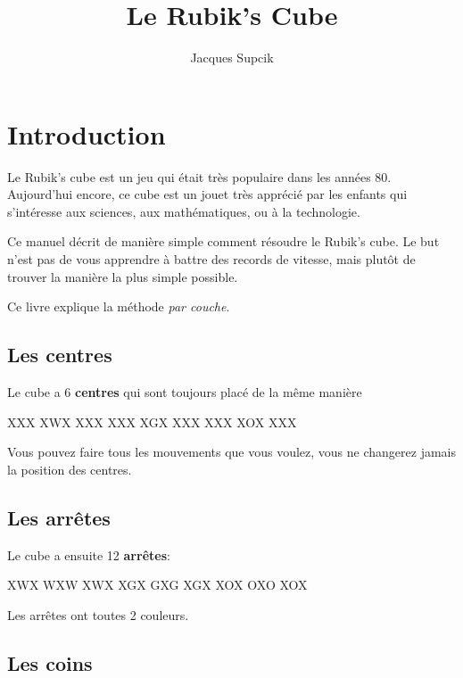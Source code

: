 \documentclass[10pt,paper=a5,pagesize]{scrbook}
\author{Jacques Supcik}
\title{Le Rubik's Cube}
\begin{document}
\maketitle
\tableofcontents

\chapter{Introduction}

Le Rubik's cube est un jeu qui était très populaire dans les années 80.
Aujourd'hui encore, ce cube est un jouet très apprécié par les enfants
qui s'intéresse aux sciences, aux mathématiques, ou à la technologie.

Ce manuel décrit de manière simple comment résoudre le Rubik's cube. Le but n'est pas de vous
apprendre à battre des records de vitesse, mais plutôt de trouver la manière la plus simple possible.

Ce livre explique la méthode \emph{par couche}.

\section{Les centres}

Le cube a 6 \textbf{centres} qui sont toujours placé de la même manière

\begin{center}
	\RubikFaceUp%
	{X}{X}{X}%
	{X}{W}{X}%
	{X}{X}{X}
	\RubikFaceRight%
	{X}{X}{X}%
	{X}{G}{X}%
	{X}{X}{X}
	\RubikFaceFront%
	{X}{X}{X}%
	{X}{O}{X}%
	{X}{X}{X}
\end{center}

Vous pouvez faire tous les mouvements que vous voulez, vous ne changerez jamais la position des centres.

\section{Les arrêtes}

Le cube a ensuite 12 \textbf{arrêtes}:

\begin{center}
	\RubikFaceUp%
	{X}{W}{X}%
	{W}{X}{W}%
	{X}{W}{X}
	\RubikFaceRight%
	{X}{G}{X}%
	{G}{X}{G}%
	{X}{G}{X}
	\RubikFaceFront%
	{X}{O}{X}%
	{O}{X}{O}%
	{X}{O}{X}
\end{center}

Les arrêtes ont toutes 2 couleurs.

\section{Les coins}
\end{document}

